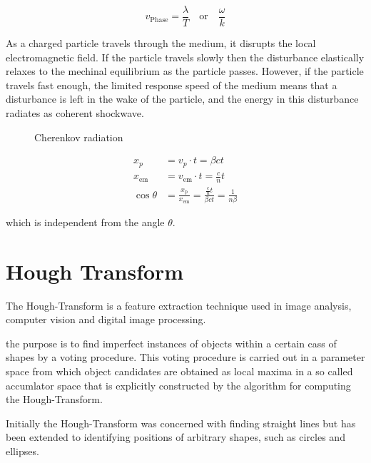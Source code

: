 \documentclass[10pt,twoside]{scrreprt}
\begin{document}
\[ v_{\text{Phase}} = \frac{\lambda}{T} \quad \text{or} \quad \frac{\omega}{k}\]

As a charged particle travels through the medium, it disrupts the local electromagnetic field. If the particle travels slowly then the disturbance elastically relaxes to the mechinal equilibrium as the particle passes. However, if the particle travels fast enough, the limited response speed of the medium means that a disturbance is left in the wake of the particle, and the energy in this disturbance radiates as coherent shockwave.

\begin{figure}[htbp]
	\centering
	\caption{Cherenkov radiation}
	\label{fig:label}
\end{figure}

\begin{align}
    x_p &= v_{p}\cdot t = \beta c t \nonumber \\
    x_{\text{em}} &= v_{\text{em}}\cdot t=\frac{c}{n}t \nonumber \\
    \cos\theta &= \frac{x_{\text{p}}}{x_{\text{em}}} = \frac{\frac{c}{n}t}{\beta c t} = \frac{1}{n\beta} \nonumber
\end{align}

which is independent from the angle \( \theta \).

\section{Hough Transform} %
\label{sec:hough_transform}

The Hough-Transform is a feature extraction technique used in image analysis, computer vision and digital image processing.

the purpose is to find imperfect instances of objects within a certain cass of shapes by a voting procedure. This voting procedure is carried out in a parameter space from which object candidates are obtained as local maxima in a so called accumlator space that is explicitly constructed by the algorithm for computing the Hough-Transform.

Initially the Hough-Transform was concerned with finding straight lines but has been extended to identifying positions of arbitrary shapes, such as circles and ellipses.
\end{document}
